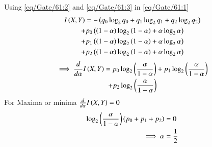 \documentclass[journal,12pt,twocolumn]{IEEEtran}
\theoremstyle{remark}
\begin{document}
Using \eqref{eq/Gate/61:2} and \eqref{eq/Gate/61:3} in \eqref{eq/Gate/61:1}
\begin{multline}
I\left(X,Y\right)= -\left(q_0\log_2 q_0 + q_1\log_2 q_1 +q_2\log_2 q_2\right) \\+ p_0\left(\left(1-\alpha\right) \log_2 \left(1-\alpha\right) + \alpha \log_2 \alpha\right)\\+p_1\left(\left(1-\alpha\right) \log_2 \left(1-\alpha\right) + \alpha \log_2 \alpha\right)\\+p_2\left(\left(1-\alpha\right) \log_2 \left(1-\alpha\right) + \alpha \log_2 \alpha\right)
\end{multline}
\begin{multline}
\implies \frac{d}{d\alpha}I\left(X,Y\right) = p_0\log_2 \left(\frac{\alpha}{1-\alpha}\right)+p_1\log_2 \left(\frac{\alpha}{1-\alpha}\right)\\+p_2\log_2 \left(\frac{\alpha}{1-\alpha}\right)
\end{multline}
For Maxima or minima $\frac{d}{d\alpha}I\left(X,Y\right) = 0$
\begin{align}
\log_2 \left(\frac{\alpha}{1-\alpha}\right)\left(p_0+p_1+p_2\right) &= 0\\
\implies \alpha &= \frac{1}{2}
\end{align}
\end{document}

